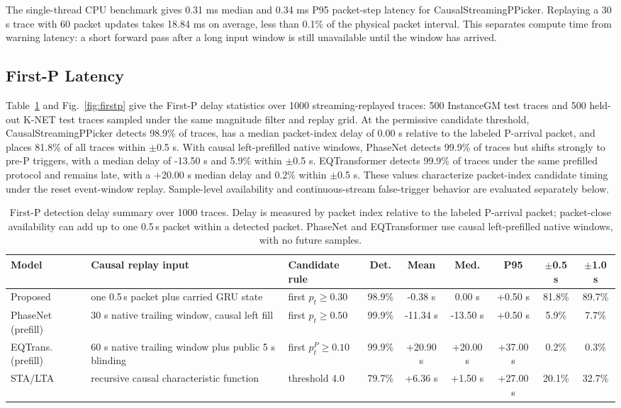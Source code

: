 \documentclass[journal]{IEEEtran}
\newcommand{\modelv}{CausalStreamingPPicker\xspace}
\newcommand{\chunk}{0.5\,s\xspace}
\newcommand{\tgrsdensetablesetup}{\footnotesize\setlength{\tabcolsep}{2.0pt}\renewcommand{\arraystretch}{1.06}}
\begin{document}
The single-thread CPU benchmark gives 0.31 ms median and 0.34 ms P95 packet-step latency for \modelv{}. Replaying a 30 s trace with 60 packet updates takes 18.84 ms on average, less than 0.1\% of the physical packet interval. This separates compute time from warning latency: a short forward pass after a long input window is still unavailable until the window has arrived.

\subsection{First-P Latency}
Table~\ref{tab:firstp} and Fig.~\ref{fig:firstp} give the First-P delay statistics over 1000 streaming-replayed traces: 500 InstanceGM test traces and 500 held-out K-NET test traces sampled under the same magnitude filter and replay grid. At the permissive candidate threshold, \modelv{} detects 98.9\% of traces, has a median packet-index delay of 0.00 s relative to the labeled P-arrival packet, and places 81.8\% of all traces within $\pm$0.5 s. With causal left-prefilled native windows, PhaseNet detects 99.9\% of traces but shifts strongly to pre-P triggers, with a median delay of -13.50 s and 5.9\% within $\pm$0.5 s. EQTransformer detects 99.9\% of traces under the same prefilled protocol and remains late, with a +20.00 s median delay and 0.2\% within $\pm$0.5 s. These values characterize packet-index candidate timing under the reset event-window replay. Sample-level availability and continuous-stream false-trigger behavior are evaluated separately below.

\begin{table}[!t]
\centering
\caption{First-P detection delay summary over 1000 traces. Delay is measured by packet index relative to the labeled P-arrival packet; packet-close availability can add up to one \chunk packet within a detected packet. PhaseNet and EQTransformer use causal left-prefilled native windows, with no future samples.}
\label{tab:firstp}
{\tgrsdensetablesetup
\begin{tabular}{@{}p{}p{}p{}cccccc@{}}
\toprule
Model & Causal replay input & Candidate rule & Det. & Mean & Med. & P95 & $\pm$0.5 s & $\pm$1.0 s\\
\midrule
Proposed & one \chunk packet plus carried GRU state & first $p_t\geq0.30$ & 98.9\% & -0.38 s & 0.00 s & +0.50 s & 81.8\% & 89.7\%\\
PhaseNet (prefill) & 30 s native trailing window, causal left fill & first $p_t\geq0.50$ & 99.9\% & -11.34 s & -13.50 s & +0.50 s & 5.9\% & 7.7\%\\
EQTrans. (prefill) & 60 s native trailing window plus public 5 s blinding & first $p_t^P\geq0.10$ & 99.9\% & +20.90 s & +20.00 s & +37.00 s & 0.2\% & 0.3\%\\
STA/LTA & recursive causal characteristic function & threshold 4.0 & 79.7\% & +6.36 s & +1.50 s & +27.00 s & 20.1\% & 32.7\%\\
\bottomrule
\end{tabular}}
\end{table}
\end{document}
